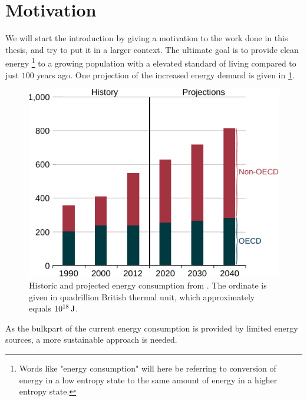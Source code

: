 \section{Motivation}
%
We will start the introduction by giving a motivation to the work done in this thesis, and try to put it in a larger context.
The ultimate goal is to provide clean energy%
\footnote{Words like "energy consumption" will here be referring to conversion of energy in a low entropy state to the same amount of energy in a higher entropy state.
}
%
to a growing population with a elevated standard of living compared to just $100$ years ago.
One projection of the increased energy demand is given in \cref{fig:energyDemand}.
%
\begin{figure}[htb]
    \begin{center}
        \includegraphics{fig/intro/energyDemand}
    \end{center}
    \caption{Historic and projected energy consumption from \cite{UEIA2016book}.
    The ordinate is given in quadrillion British thermal unit, which approximately equals $10^{18} \, \text{J}$.
    }
    \label{fig:energyDemand}
\end{figure}

\noindent
As the bulkpart of the current energy consumption is provided by limited energy sources, a more sustainable approach is needed.

